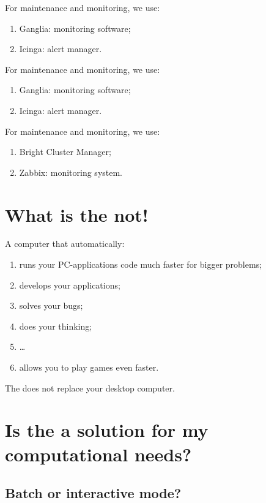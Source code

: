 \ifantwerpen
    For maintenance and monitoring, we use:
    \begin{enumerate}
      \item  Ganglia: monitoring software;
      \item  Icinga: alert manager.
    \end{enumerate}
\fi
\ifleuven
    For maintenance and monitoring, we use:
    \begin{enumerate}
      \item  Ganglia: monitoring software;
      \item  Icinga: alert manager.
    \end{enumerate}
\fi
\ifbrussel
    For maintenance and monitoring, we use:
    \begin{enumerate}
      \item  Bright Cluster Manager;
      \item  Zabbix: monitoring system.
    \end{enumerate}
\fi


\section{What is the \hpc not!}
\label{sec:what-is-the-hpc-not}

A computer that automatically:
\begin{enumerate}
  \item  runs your PC-applications code much faster for bigger problems;
  \item  develops your applications;
  \item  solves your bugs;
  \item  does your thinking;
  \item  \dots
  \item  allows you to play games even faster.
\end{enumerate}
The \hpc does not replace your desktop computer.

\section{Is the \hpc a solution for my computational needs?}
\label{sec:is-the-hpc-a-solution-for-my-computational-needs}

\subsection{Batch or interactive mode?}
\label{sec:batch-or-interactive-mode}

